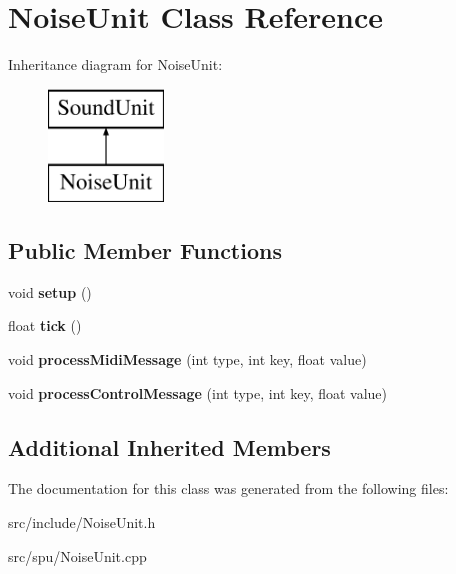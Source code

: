 \hypertarget{classNoiseUnit}{\section{Noise\-Unit Class Reference}
\label{classNoiseUnit}
}
Inheritance diagram for Noise\-Unit\-:\begin{figure}[H]
\begin{center}
\leavevmode
\includegraphics[height=3.000000cm]{classNoiseUnit}
\end{center}
\end{figure}
\subsection*{Public Member Functions}
\begin{DoxyCompactItemize}
\item 
\hypertarget{classNoiseUnit_a81666e8bdea833fad6a4451a765c6b83}{void {\bfseries setup} ()}\label{classNoiseUnit_a81666e8bdea833fad6a4451a765c6b83}

\item 
\hypertarget{classNoiseUnit_af48a9a915f7f593105e8fe2d2ddb745a}{float {\bfseries tick} ()}\label{classNoiseUnit_af48a9a915f7f593105e8fe2d2ddb745a}

\item 
\hypertarget{classNoiseUnit_a58e18639dc527bb67184b38107bd6acf}{void {\bfseries process\-Midi\-Message} (int type, int key, float value)}\label{classNoiseUnit_a58e18639dc527bb67184b38107bd6acf}

\item 
\hypertarget{classNoiseUnit_a755cc04254bf8ecba6082ea8d6151d6c}{void {\bfseries process\-Control\-Message} (int type, int key, float value)}\label{classNoiseUnit_a755cc04254bf8ecba6082ea8d6151d6c}

\end{DoxyCompactItemize}
\subsection*{Additional Inherited Members}


The documentation for this class was generated from the following files\-:\begin{DoxyCompactItemize}
\item 
src/include/Noise\-Unit.\-h\item 
src/spu/Noise\-Unit.\-cpp\end{DoxyCompactItemize}
